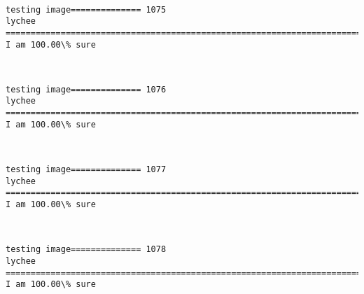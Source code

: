 \documentclass[11pt]{article}
\begin{document}
    \begin{center}
    \end{center}
    { \hspace*{\fill} \\}
    
    \begin{Verbatim}[commandchars=\\\{\}]
testing image============== 1075
lychee
============================================================================
I am 100.00\% sure

    \end{Verbatim}

    \begin{center}
    \end{center}
    { \hspace*{\fill} \\}
    
    \begin{Verbatim}[commandchars=\\\{\}]
testing image============== 1076
lychee
============================================================================
I am 100.00\% sure

    \end{Verbatim}

    \begin{center}
    \end{center}
    { \hspace*{\fill} \\}
    
    \begin{Verbatim}[commandchars=\\\{\}]
testing image============== 1077
lychee
============================================================================
I am 100.00\% sure

    \end{Verbatim}

    \begin{center}
    \end{center}
    { \hspace*{\fill} \\}
    
    \begin{Verbatim}[commandchars=\\\{\}]
testing image============== 1078
lychee
============================================================================
I am 100.00\% sure

    \end{Verbatim}
\end{document}
